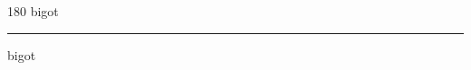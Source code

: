 
\begin{frame}
\begin{center}
\begin{turn}{180}
{\fontsize{2.5cm}{1em}\selectfont bigot}
\end{turn}
\vspace{1em}\par  
\hrule
\vspace{1em}\par  
{\fontsize{2.5cm}{1em}\selectfont bigot}
\end{center}
\end{frame}
